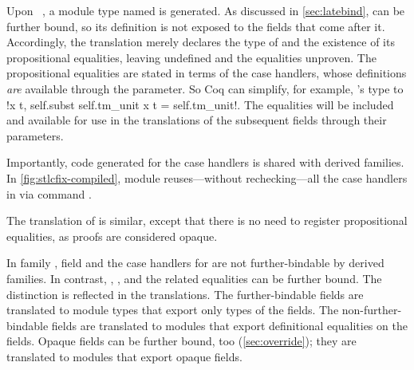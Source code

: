 Upon ~, a module type named  is generated.
%
As discussed in \cref{sec:latebind},  can be further bound,
so its definition is not exposed to the fields that come after it.
Accordingly, the translation  merely declares the type of 
and the existence of its propositional equalities, leaving  undefined
and the equalities unproven.
%
The propositional equalities are stated in terms of the case handlers,
whose definitions \emph{are} available through the  parameter.
So Coq can simplify, for example, 's type to
\lsti!\forall x t, self.subst self.tm_unit x t = self.tm_unit!.
The equalities will be included and available for use in the
translations of the subsequent fields through their 
parameters.

Importantly, code generated for the case handlers is shared with derived families.
In \cref{fig:stlcfix-compiled}, module 
reuses---without rechecking---all the case handlers in
 via command .

The translation of  is similar, except that there is no need to
register propositional equalities, as  proofs are considered opaque.



In family ,
field  and the case handlers for 
are not further-bindable by derived families.
In contrast, , , and the related equalities
can be further bound.
The distinction is reflected in the translations.
The further-bindable fields are translated to module types that export only types of the fields.
The non-further-bindable fields are translated to modules that export definitional equalities
on the fields.
Opaque fields can be further bound, too (\cref{sec:override});
they are translated to modules that export opaque fields.



